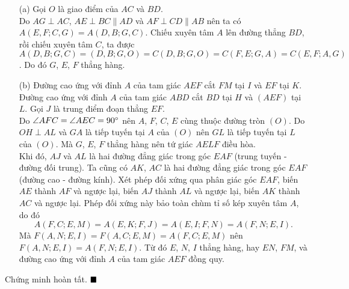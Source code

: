 \documentclass{article} %
\newenvironment{solution}[1][Lời giải]{%
  \proof[\faPenNib \hspace{0.2cm} \ttfamily \scshape \large #1]%
}{\(\hfill \blacksquare\){\parfillskip0pt\par}}
\begin{document}
        \begin{solution}
            \hfill
            \begin{enumerate}
                \item[(a)] Gọi \(O\) là giao điểm của \(AC\) và \(BD\).\\
                Do \(AG \perp AC\), \(AE \perp BC \parallel AD\) và \(AF \perp CD \parallel AB\) nên ta có \(A(E,F;C,G) = A(D,B;G,C)\). Chiếu xuyên tâm \(A\) lên đường thẳng \(BD\), rồi chiếu xuyên tâm \(C\), ta được \(A(D,B;G,C) = (D,B;G,O) = C(D,B;G,O) = C(F,E;G,A) = C(E,F;A,G)\). Do đó \(G\), \(E\), \(F\) thẳng hàng.
                \item[(b)] Đường cao ứng với đỉnh \(A\) của tam giác \(AEF\) cắt \(FM\) tại \(I\) và \(EF\) tại \(K\). Đường cao ứng với đỉnh \(A\) của tam giác \(ABD\) cắt \(BD\) tại \(H\) và \((AEF)\) tại \(L\). Gọi \(J\) là trung điểm đoạn thẳng \(EF\).\\
                Do \(\angle AFC = \angle AEC = 90 \degree\) nên \(A\), \(F\), \(C\), \(E\) cùng thuộc đường tròn \((O)\). Do \(OH \perp AL\) và \(GA\) là tiếp tuyến tại \(A\) của \((O)\) nên \(GL\) là tiếp tuyến tại \(L\) của \((O)\). Mà \(G\), \(E\), \(F\) thẳng hàng nên tứ giác \(AELF\) điều hòa.\\
                Khi đó, \(AJ\) và \(AL\) là hai đường đẳng giác trong góc \(EAF\) (trung tuyến - đường đối trung). Ta cũng có \(AK\), \(AC\) là hai đường đẳng giác trong góc \(EAF\) (đường cao - đường kính). Xét phép đối xứng qua phân giác góc \(EAF\), biến \(AE\) thành \(AF\) và ngược lại, biến \(AJ\) thành \(AL\) và ngược lại, biến \(AK\) thành \(AC\) và ngược lại. Phép đối xứng này bảo toàn chùm tỉ số kép xuyên tâm \(A\), do đó
                \[A(F,C;E,M) = A(E,K;F,J) = A(E,I;F,N) = A(F,N;E,I).\]
                Mà \(F(A,N;E,I) = F(A,C;E,M) = A(F,C;E,M)\) nên \(F(A,N;E,I) = A(F,N;E,I)\). Từ đó \(E\), \(N\), \(I\) thẳng hàng, hay \(EN\), \(FM\), và đường cao ứng với đỉnh \(A\) của tam giác \(AEF\) đồng quy.
            \end{enumerate}
            Chứng minh hoàn tất.
        \end{solution}
\end{document}
